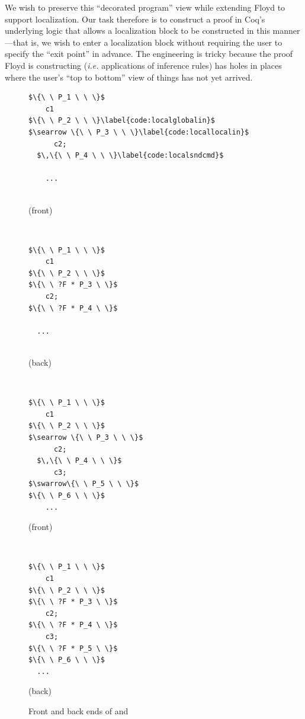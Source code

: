 We wish to preserve this ``decorated program'' view while extending Floyd to support localization.  Our task therefore is to construct a proof in Coq's underlying logic that allows a localization block to be constructed in this manner---that is, we wish to enter a localization block without requiring the user to specify the ``exit point'' in advance.  The engineering is tricky because the proof Floyd is constructing (\emph{i.e.} applications of inference rules) has holes in places where the user's ``top to bottom'' view of things has not yet arrived.

\begin{figure}
\begin{minipage}{.15\textwidth}
\begin{lstlisting}[basicstyle=\linespread{0.8}\normalfont\footnotesize\tt]
$\{\ \ P_1 \ \ \}$
    c1
$\{\ \ P_2 \ \ \}\label{code:localglobalin}$
$\searrow \{\ \ P_3 \ \ \}\label{code:locallocalin}$
      c2;
  $\,\{\ \ P_4 \ \ \}\label{code:localsndcmd}$

    ...


\end{lstlisting}
\centerline{\footnotesize(front)}
\end{minipage} \vline ~
\begin{minipage}{.15\textwidth}
\begin{lstlisting}[numbers=none, basicstyle=\linespread{0.8}\normalfont\footnotesize\tt]
$\{\ \ P_1 \ \ \}$
    c1
$\{\ \ P_2 \ \ \}$
$\{\ \ ?F * P_3 \ \}$
    c2;
$\{\ \ ?F * P_4 \ \}$

  ...


\end{lstlisting}
\centerline{\footnotesize(back)}
\end{minipage} \vline \vline ~
\begin{minipage}{.15\textwidth}
\begin{lstlisting}[numbers=none, basicstyle=\linespread{0.8}\normalfont\footnotesize\tt]
$\{\ \ P_1 \ \ \}$
    c1
$\{\ \ P_2 \ \ \}$
$\searrow \{\ \ P_3 \ \ \}$
      c2;
  $\,\{\ \ P_4 \ \ \}$
      c3;
$\swarrow\{\ \ P_5 \ \ \}$
$\{\ \ P_6 \ \ \}$
    ...
\end{lstlisting}
\centerline{\footnotesize(front)}
\end{minipage} \vline ~
\begin{minipage}{.15\textwidth}
\begin{lstlisting}[numbers=none, basicstyle=\linespread{0.8}\normalfont\footnotesize\tt]
$\{\ \ P_1 \ \ \}$
    c1
$\{\ \ P_2 \ \ \}$
$\{\ \ ?F * P_3 \ \}$
    c2;
$\{\ \ ?F * P_4 \ \}$
    c3;
$\{\ \ ?F * P_5 \ \}$
$\{\ \ P_6 \ \ \}$
  ...
\end{lstlisting}
\centerline{\footnotesize(back)}
\end{minipage}
\caption{Front and back ends of  and }
\label{figure:backend}
\end{figure}

